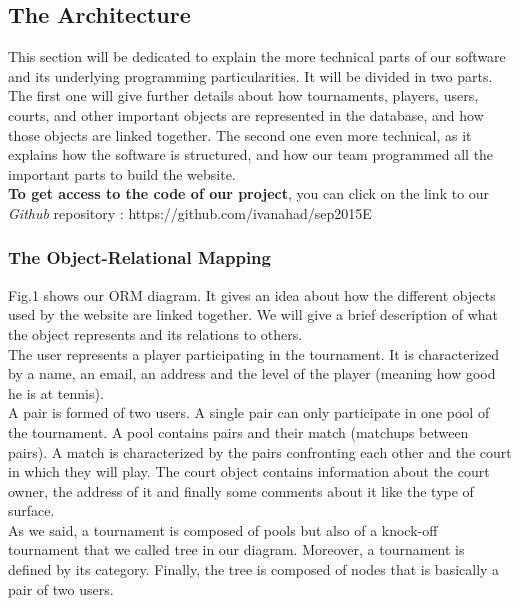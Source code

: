 \documentclass[a4paper, 12pt]{article}
\begin{document}
\subsection{The Architecture}
This section will be dedicated to explain the more technical parts of our software and its underlying programming particularities. It will be divided in two parts. The first one will give further details about how tournaments, players, users, courts, and other important objects are represented in the database, and how those objects are linked together. The second one even more technical, as it explains how the software is structured, and how our team programmed all the important parts to build the website.\\


\textbf{To get access to the code of our project}, you can click on the link to our \textit{Github} repository : https://github.com/ivanahad/sep2015E\\

\newpage
\subsubsection{The Object-Relational Mapping}
Fig.1 shows our ORM diagram. It gives an idea about how the different objects used by the website are linked together. We will give a brief description of what the object represents and its relations to others.\\

The user represents a player participating in the tournament. It is characterized by a name, an email, an address and the level of the player (meaning how good he is at tennis).\\

A pair is formed of two users. A single pair can only participate in one pool of the tournament. A pool contains pairs and their match (matchups between pairs). A match is characterized by the pairs confronting each other and the court in which they will play. The court object contains information about the court owner, the address of it and finally some comments about it like the type of surface.\\

As we said, a tournament is composed of pools but also of a knock-off tournament that we called tree in our diagram. Moreover, a tournament is defined by its category. Finally, the tree is composed of nodes that is basically a pair of two users.\\
\end{document}
